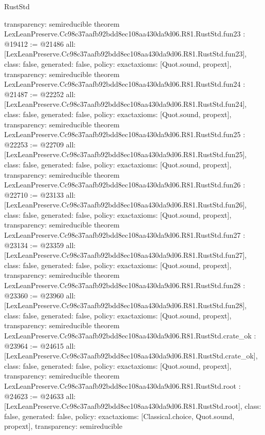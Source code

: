 \begin{lexlean}{RustStd}
\begin{coremodule}
{  transparency: semireducible
}
theorem LexLeanPreserve.Cc98c37aafb92bdd8ec108aa430da9d06.R81.RustStd.fun23 : @19412 := @21486 {
  all: [LexLeanPreserve.Cc98c37aafb92bdd8ec108aa430da9d06.R81.RustStd.fun23],
  class: false,
  generated: false,
  policy: exact{axioms: [Quot.sound, propext]},
  transparency: semireducible
}
theorem LexLeanPreserve.Cc98c37aafb92bdd8ec108aa430da9d06.R81.RustStd.fun24 : @21487 := @22252 {
  all: [LexLeanPreserve.Cc98c37aafb92bdd8ec108aa430da9d06.R81.RustStd.fun24],
  class: false,
  generated: false,
  policy: exact{axioms: [Quot.sound, propext]},
  transparency: semireducible
}
theorem LexLeanPreserve.Cc98c37aafb92bdd8ec108aa430da9d06.R81.RustStd.fun25 : @22253 := @22709 {
  all: [LexLeanPreserve.Cc98c37aafb92bdd8ec108aa430da9d06.R81.RustStd.fun25],
  class: false,
  generated: false,
  policy: exact{axioms: [Quot.sound, propext]},
  transparency: semireducible
}
theorem LexLeanPreserve.Cc98c37aafb92bdd8ec108aa430da9d06.R81.RustStd.fun26 : @22710 := @23133 {
  all: [LexLeanPreserve.Cc98c37aafb92bdd8ec108aa430da9d06.R81.RustStd.fun26],
  class: false,
  generated: false,
  policy: exact{axioms: [Quot.sound, propext]},
  transparency: semireducible
}
theorem LexLeanPreserve.Cc98c37aafb92bdd8ec108aa430da9d06.R81.RustStd.fun27 : @23134 := @23359 {
  all: [LexLeanPreserve.Cc98c37aafb92bdd8ec108aa430da9d06.R81.RustStd.fun27],
  class: false,
  generated: false,
  policy: exact{axioms: [Quot.sound, propext]},
  transparency: semireducible
}
theorem LexLeanPreserve.Cc98c37aafb92bdd8ec108aa430da9d06.R81.RustStd.fun28 : @23360 := @23960 {
  all: [LexLeanPreserve.Cc98c37aafb92bdd8ec108aa430da9d06.R81.RustStd.fun28],
  class: false,
  generated: false,
  policy: exact{axioms: [Quot.sound, propext]},
  transparency: semireducible
}
theorem LexLeanPreserve.Cc98c37aafb92bdd8ec108aa430da9d06.R81.RustStd.crate_ok : @23964 := @24615 {
  all: [LexLeanPreserve.Cc98c37aafb92bdd8ec108aa430da9d06.R81.RustStd.crate_ok],
  class: false,
  generated: false,
  policy: exact{axioms: [Quot.sound, propext]},
  transparency: semireducible
}
theorem LexLeanPreserve.Cc98c37aafb92bdd8ec108aa430da9d06.R81.RustStd.root : @24623 := @24633 {
  all: [LexLeanPreserve.Cc98c37aafb92bdd8ec108aa430da9d06.R81.RustStd.root],
  class: false,
  generated: false,
  policy: exact{axioms: [Classical.choice, Quot.sound, propext]},
  transparency: semireducible
}


\end{coremodule}
\end{lexlean}
